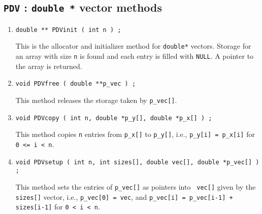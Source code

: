 \par
\subsection{{\tt PDV} : {\tt double *} vector methods}
\label{subsection:Utilities:proto:PDV}
\par
\begin{enumerate}
\item
\begin{verbatim}
double ** PDVinit ( int n ) ;
\end{verbatim}
This is the allocator and initializer method for {\tt double*} vectors.
Storage for an array with size {\tt n} is found and each
entry is filled with {\tt NULL}.
A pointer to the array is returned.
\item
\begin{verbatim}
void PDVfree ( double **p_vec ) ;
\end{verbatim}
This method releases the storage taken by {\tt p\_vec[]}.
\item
\begin{verbatim}
void PDVcopy ( int n, double *p_y[], double *p_x[] ) ;
\end{verbatim}
This method copies {\tt n} entries from {\tt p\_x[]} to {\tt p\_y[]},
i.e.,
{\tt p\_y[i] = p\_x[i]} for {\tt 0 <= i < n}.
\item
\begin{verbatim}
void PDVsetup ( int n, int sizes[], double vec[], double *p_vec[] ) ;
\end{verbatim}
This method sets the entries of {\tt p\_vec[]} as pointers into {\tt
vec[]} given by the {\tt sizes[]} vector,
i.e.,
{\tt p\_vec[0] = vec}, and 
{\tt p\_vec[i] = p\_vec[i-1] + sizes[i-1]} 
for {\tt 0 < i < n}.
\end{enumerate}
